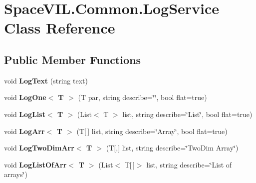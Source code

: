 \hypertarget{class_space_v_i_l_1_1_common_1_1_log_service}{}\section{Space\+V\+I\+L.\+Common.\+Log\+Service Class Reference}
\label{class_space_v_i_l_1_1_common_1_1_log_service}
\subsection*{Public Member Functions}
\begin{DoxyCompactItemize}
\item 
\mbox{\label{class_space_v_i_l_1_1_common_1_1_log_service_abb61cb278a408d1cde36cd90246f624b}} 
void {\bfseries Log\+Text} (string text)
\item 
\mbox{\label{class_space_v_i_l_1_1_common_1_1_log_service_aa7ae9e8e14dd99b4e83928e99d493e29}} 
void {\bfseries Log\+One$<$ T $>$} (T par, string describe=\char`\"{}\char`\"{}, bool flat=true)
\item 
\mbox{\label{class_space_v_i_l_1_1_common_1_1_log_service_a36590f34bfbbbe9f941e5261c082e9cb}} 
void {\bfseries Log\+List$<$ T $>$} (List$<$ T $>$ list, string describe=\char`\"{}List\char`\"{}, bool flat=true)
\item 
\mbox{\label{class_space_v_i_l_1_1_common_1_1_log_service_a0daf57718cad8952df82324116eb5e50}} 
void {\bfseries Log\+Arr$<$ T $>$} (T\mbox{[}$\,$\mbox{]} list, string describe=\char`\"{}Array\char`\"{}, bool flat=true)
\item 
\mbox{\label{class_space_v_i_l_1_1_common_1_1_log_service_a9b6ba5e743ad85bdd475a17b2fa552ec}} 
void {\bfseries Log\+Two\+Dim\+Arr$<$ T $>$} (T\mbox{[},\mbox{]} list, string describe=\char`\"{}Two\+Dim Array\char`\"{})
\item 
\mbox{\label{class_space_v_i_l_1_1_common_1_1_log_service_a093358093d1ba93b2eb39b6d7f4f4342}} 
void {\bfseries Log\+List\+Of\+Arr$<$ T $>$} (List$<$ T\mbox{[}$\,$\mbox{]}$>$ list, string describe=\char`\"{}List of arrays\char`\"{})

\end{DoxyCompactItemize}
